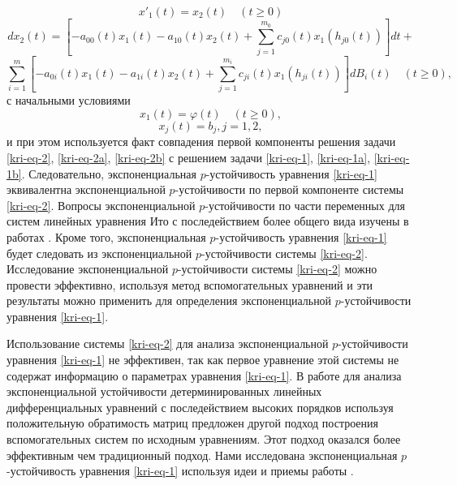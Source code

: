 \begin{equation*}
	x'_1(t) = x_2(t)\quad(t\ge0)
\end{equation*}
\begin{equation}\label{kri-eq-2}
	dx_2(t) = \left[-a_{00}(t)x_1(t) - a_{10}(t)x_2(t) + \sum_{j=1}^{m_0}c_{j0}(t)x_1(h_{j0}(t))\right]dt +
\end{equation}
\begin{equation*}
	\sum_{i=1}^{m} \left[-a_{0i}(t)x_1(t)-a_{1i}(t)x_2(t)+\sum_{j=1}^{m_i}c_{ji}(t)x_1(h_{ji}(t))\right]dB_i(t) \quad (t \ge 0),
\end{equation*}
с начальными условиями
\begin{equation}\label{kri-eq-2a}
	x_1(t)=\varphi (t)\quad(t\ge 0),
\end{equation}
\begin{equation}\label{kri-eq-2b}
	x_j(t)=b_j, j=1,2,
\end{equation}
и при этом используется факт совпадения первой компоненты решения задачи \eqref{kri-eq-2}, \eqref{kri-eq-2a}, \eqref{kri-eq-2b} с решением задачи \eqref{kri-eq-1}, \eqref{kri-eq-1a},
\eqref{kri-eq-1b}. Следовательно, экспоненциальная  $p$-\linebreak устойчивость уравнения \eqref{kri-eq-1} эквивалентна экспоненциальной
$p${}-устойчивости по первой компоненте системы \eqref{kri-eq-2}. Вопросы экспоненциальной  $p${}-устойчивости по части переменных
для систем линейных уравнения Ито с последействием более общего вида изучены в работах \cite{kri-bib-19, kri-bib-20}. Кроме того,
экспоненциальная  $p${}-устойчивость уравнения \eqref{kri-eq-1} будет следовать из экспоненциальной  $p${}-устойчивости системы \eqref{kri-eq-2}.
Исследование экспоненциальной  $p${}-устойчивости системы \eqref{kri-eq-2} можно провести эффективно, используя метод
вспомогательных уравнений и эти результаты можно применить для определения экспоненциальной  $p${}-устойчивости
уравнения \eqref{kri-eq-1}.

Использование системы \eqref{kri-eq-2} для анализа экспоненциальной  $p${}-устойчивости уравнения \eqref{kri-eq-1} не эффективен, так как первое
уравнение этой системы не содержат информацию о параметрах уравнения \eqref{kri-eq-1}. В работе \cite{kri-bib-16} для анализа экспоненциальной
устойчивости детерминированных линейных дифференциальных уравнений с последействием высоких порядков используя
положительную обратимость матриц предложен другой подход построения вспомогательных систем по исходным уравнениям. Этот
подход оказался более эффективным чем традиционный подход. Нами исследована экспоненциальная  $p${}-устойчивость
уравнения \eqref{kri-eq-1} используя идеи и приемы работы \cite{kri-bib-16}.

